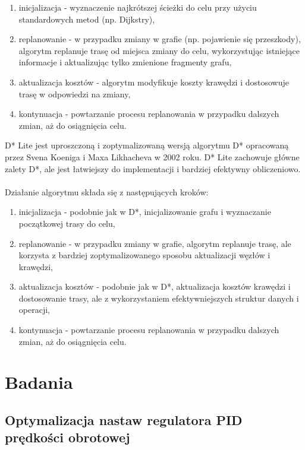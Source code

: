 \documentclass[12pt,twoside]{article}
\begin{document}
\begin{enumerate}[label=\alph*), leftmargin=1.25cm]
	\item inicjalizacja - wyznaczenie najkrótszej ścieżki do celu przy użyciu standardowych metod (np. Dijkstry),
	\item replanowanie - w przypadku zmiany w grafie (np. pojawienie się przeszkody), algorytm replanuje trasę od miejsca zmiany do celu, wykorzystując istniejące informacje i aktualizując tylko zmienione fragmenty grafu,
	\item aktualizacja kosztów - algorytm modyfikuje koszty krawędzi i dostosowuje trasę w odpowiedzi na zmiany,
	\item kontynuacja - powtarzanie procesu replanowania w przypadku dalszych zmian, aż do osiągnięcia celu.
	
\end{enumerate}

D* Lite \cite{DSTARLITE} jest uproszczoną i zoptymalizowaną wersją algorytmu D*  opracowaną przez Svena Koeniga i Maxa Likhacheva w 2002 roku. D* Lite zachowuje główne zalety D*, ale jest łatwiejszy do implementacji i bardziej efektywny obliczeniowo.
\\ \\
Działanie algorytmu składa się z następujących kroków:

\begin{enumerate}[label=\alph*), leftmargin=1.25cm]
	\item inicjalizacja - podobnie jak w D*, inicjalizowanie grafu i wyznaczanie początkowej trasy do celu,
	\item replanowanie - w przypadku zmiany w grafie, algorytm replanuje trasę, ale korzysta z bardziej zoptymalizowanego sposobu aktualizacji węzłów i krawędzi,
	\item aktualizacja kosztów - podobnie jak w D*, aktualizacja kosztów krawędzi i dostosowanie trasy, ale z wykorzystaniem efektywniejszych struktur danych i operacji,
	\item kontynuacja - powtarzanie procesu replanowania w przypadku dalszych zmian, aż do osiągnięcia celu.
	
\end{enumerate}

\section{Badania}
\subsection{Optymalizacja nastaw regulatora PID prędkości obrotowej}
\end{document}
